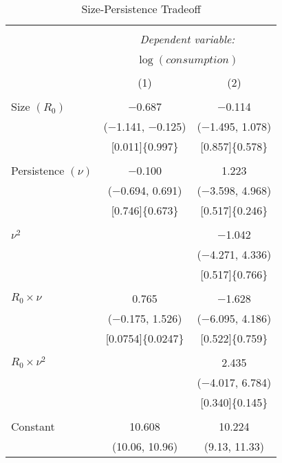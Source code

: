 \documentclass[12pt]{article}
\numberwithin{equation}{section}
\begin{document}
\begin{table}[!htb] \centering \footnotesize
    \begin{threeparttable}
    \caption{Size-Persistence Tradeoff} 
    \label{tab:Size-Persistence} 
    \begin{tabular}{@{\extracolsep{50pt}}lcc} 
      \\[-1.8ex]\hline 
      \hline \\[-1.8ex] 
       & \multicolumn{2}{c}{\textit{Dependent variable:}} \\ 
      \cline{2-3} 
      \\[-1.8ex] & \multicolumn{2}{c}{$\log(\mathit{consumption})$} \\ 
      \\[-1.8ex] & (1) & (2)\\ 
      \hline \\[-1.8ex] 
       Size $(R_0)$  & $-$0.687 & $-$0.114 \\ 
        & ($-$1.141, $-$0.125) & ($-$1.495, 1.078)    \\ 
        &[0.011]\{0.997\} & [0.857]\{0.578\}\\ 
        & & \\ 
       Persistence $(\nu)$ & $-$0.100 & 1.223 \\ 
        & ($-$0.694,  0.691)   & ($-$3.598, 4.968)    \\ 
        &[0.746]\{0.673\} & [0.517]\{0.246\}\\ 
        & & \\ 
        $\nu^2$ &  & $-$1.042 \\ 
        &  &  ($-$4.271, 4.336) \\ 
        & &[0.517]\{0.766\} \\ 
        & & \\ 
       $R_0\times \nu$ & 0.765 & $-$1.628 \\ 
        & ($-$0.175,  1.526)    &   ($-$6.095,  4.186)     \\ 
        &[0.0754]\{0.0247\} & [0.522]\{0.759\}\\ 
        & & \\ 
        $R_0\times \nu^2$ &  & 2.435 \\ 
        &  &  ($-$4.017, 6.784) \\ 
        & & [0.340]\{0.145\}\\ 
        & & \\ 
       Constant & 10.608 & 10.224 \\ 
        & (10.06, 10.96) & (9.13, 11.33)    \\ 

\end{tabular}
\end{threeparttable}
\end{table}
\end{document}
